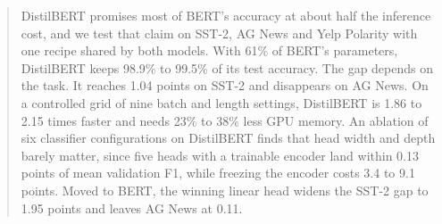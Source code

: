 \begin{abstract}
DistilBERT promises most of BERT's accuracy at about half the inference cost,
and we test that claim on SST-2, AG News and Yelp Polarity with one recipe
shared by both models.
With 61\% of BERT's parameters, DistilBERT keeps 98.9\% to 99.5\% of its test
accuracy. The gap depends on the task. It reaches 1.04 points on SST-2 and
disappears on AG News. On a controlled grid of nine batch and length settings,
DistilBERT is 1.86 to 2.15 times faster and needs 23\% to 38\% less GPU
memory. An ablation of six classifier configurations on DistilBERT finds that
head width and depth barely matter, since five heads with a trainable encoder
land within 0.13 points of mean validation F1, while freezing the encoder
costs 3.4 to 9.1 points. Moved to BERT, the winning linear head widens the
SST-2 gap to 1.95 points and leaves AG News at 0.11.
\end{abstract}

